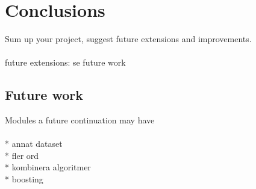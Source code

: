 \chapter{Conclusions}
Sum up your project, suggest future extensions and improvements.
\\\\
future extensions: se future work

\section{Future work}
Modules a future continuation may have
\\\\
* annat dataset\\
* fler ord\\
* kombinera algoritmer\\
* boosting\\
